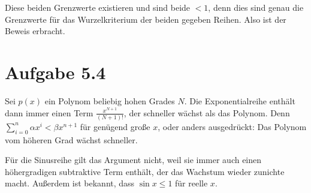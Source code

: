 \documentclass[a4paper,german,12pt,smallheadings]{scrartcl}
\begin{document}
Diese beiden Grenzwerte existieren und sind beide $<1$, denn dies sind genau
die Grenzwerte für das Wurzelkriterium der beiden gegeben Reihen. Also ist der
Beweis erbracht.


\section{Aufgabe 5.4}

Sei $p(x)$ ein Polynom beliebig hohen Grades $N$. Die Exponentialreihe enthält
dann immer einen Term $\frac{x^{N+1}}{(N+1)!}$, der schneller wächst als das
Polynom. Denn $\sum_{i=0}^n \alpha x^i < \beta x^{n+1}$ für genügend große $x$,
oder anders ausgedrückt: Das Polynom vom höheren Grad wächst schneller.

Für die Sinusreihe gilt das Argument nicht, weil sie immer auch einen
höhergradigen subtraktive Term enthält, der das Wachstum wieder zunichte macht.
Außerdem ist bekannt, dass $\sin x \le 1$ für reelle $x$.
\end{document}
